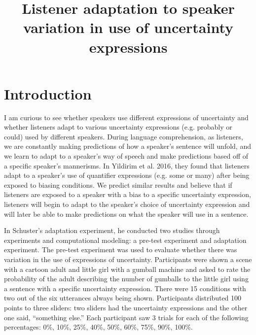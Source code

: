\documentclass{sp}          %
\title{Listener adaptation to speaker variation in use of uncertainty expressions}
\author{%
  \spauthor{Replication of adaptation experiment by Sebastian Schuster and Judith Degen
  Aleeza Yu\\ \today}
}
\begin{document}

\maketitle





\section{Introduction}

I am curious to see whether speakers use different expressions of uncertainty and whether listeners adapt to various uncertainty expressions (e.g. probably or could) used by different speakers. During language comprehension, as listeners, we are constantly making predictions of how a speaker’s sentence will unfold, and we learn to adapt to a speaker’s way of speech and make predictions based off of a specific speaker’s mannerisms. In Yildirim et al. 2016, they found that listeners adapt to a speaker’s use of quantifier expressions (e.g. some or many) after being exposed to biasing conditions. We predict similar results and believe that if listeners are exposed to a speaker with a bias to a specific uncertainty expression, listeners will begin to adapt to the speaker’s choice of uncertainty expression and will later be able to make predictions on what the speaker will use in a sentence.

In Schuster’s adaptation experiment, he conducted two studies through experiments and computational modeling: a pre-test experiment and adaptation experiment. The pre-test experiment was used to evaluate whether there was variation in the use of expressions of uncertainty. Participants were shown a scene with a cartoon adult and little girl with a gumball machine and asked to rate the probability of the adult describing the number of gumballs to the little girl using a sentence with a specific uncertainty expression. There were 15 conditions with two out of the six utterances always being shown. Participants distributed 100 points to three sliders: two sliders had the uncertainty expressions and the other one said, “something else.” Each participant saw 3 trials for each of the following percentages:
0\%, 10\%, 25\%, 40\%, 50\%, 60\%, 75\%, 90\%, 100\%. 
\end{document}
